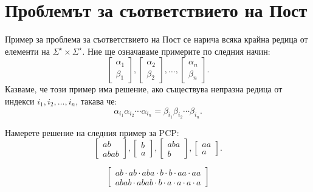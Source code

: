 \section{Проблемът за съответствието на Пост}\label{sect:turing:pcp}


Пример за проблема за съответствието на Пост се нарича всяка крайна редица от елементи на $\Sigma^\star \times \Sigma^\star$.
Ние ще означаваме примерите по следния начин:
\[\begin{bmatrix} \alpha_1\\ \beta_1\end{bmatrix},\begin{bmatrix} \alpha_2\\ \beta_2\end{bmatrix},\dots,\begin{bmatrix} \alpha_n\\ \beta_n\end{bmatrix}.\]
Казваме, че този пример има решение, ако съществува непразна редица от индекси $i_1,i_2,\dots,i_n$, такава че:
\[\alpha_{i_1}\alpha_{i_2}\cdots\alpha_{i_n} = \beta_{i_1}\beta_{i_2}\cdots\beta_{i_n}.\]

\begin{problem}
  Намерете решение на следния пример за PCP:
  \[\begin{bmatrix}ab\\ abab\end{bmatrix},\begin{bmatrix} b\\ a\end{bmatrix},\begin{bmatrix} aba\\ b\end{bmatrix},\begin{bmatrix} aa\\ a\end{bmatrix}.\]
\end{problem}
\begin{solution}
  \[\begin{bmatrix}ab\cdot ab \cdot aba \cdot b \cdot b \cdot aa \cdot aa\\abab \cdot abab \cdot b \cdot a \cdot a \cdot a \cdot a\end{bmatrix}\]
\end{solution}


